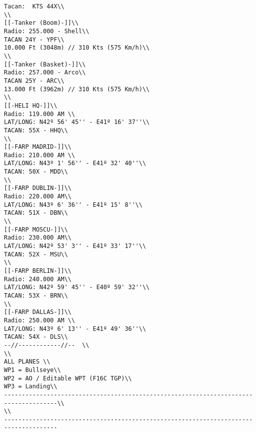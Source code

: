 \documentclass{article}
\begin{document}
\begin{verbatim}
Tacan:  KTS 44X\\
\\
[[-Tanker (Boom)-]]\\
Radio: 255.000 - Shell\\
TACAN 24Y - YPF\\
10.000 Ft (3048m) // 310 Kts (575 Km/h)\\
\\
[[-Tanker (Basket)-]]\\
Radio: 257.000 - Arco\\
TACAN 25Y - ARC\\
13.000 Ft (3962m) // 310 Kts (575 Km/h)\\
\\
[[-HELI HQ-]]\\
Radio: 119.000 AM \\
LAT/LONG: N42º 56' 45'' - E41º 16' 37''\\
TACAN: 55X - HHQ\\
\\
[[-FARP MADRID-]]\\
Radio: 210.000 AM \\
LAT/LONG: N43º 1' 56'' - E41º 32' 40''\\
TACAN: 50X - MDD\\
\\
[[-FARP DUBLIN-]]\\
Radio: 220.000 AM\\
LAT/LONG: N43º 6' 36'' - E41º 15' 8''\\
TACAN: 51X - DBN\\
\\
[[-FARP MOSCU-]]\\
Radio: 230.000 AM\\
LAT/LONG: N42º 53' 3'' - E41º 33' 17''\\
TACAN: 52X - MSU\\
\\
[[-FARP BERLIN-]]\\
Radio: 240.000 AM\\
LAT/LONG: N42º 59' 45'' - E40º 59' 32''\\
TACAN: 53X - BRN\\
\\
[[-FARP DALLAS-]]\\
Radio: 250.000 AM \\
LAT/LONG: N43º 6' 13'' - E41º 49' 36''\\
TACAN: 54X - DLS\\
--//------------//--  \\
\\
ALL PLANES \\
WP1 = Bullseye\\
WP2 = AO / Editable WPT (F16C TGP)\\
WP3 = Landing\\
-------------------------------------------------------------------------------------\\
\\
-------------------------------------------------------------------------------------
                    \end{verbatim}

                    
\end{document}
